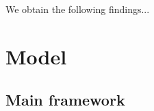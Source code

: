 \documentclass[12pt, a4paper]{article}
\begin{document}
We obtain the following findings...







%


\section{Model}\label{sec:Model}

\subsection{Main framework}\label{sec:main_framework}
\end{document}
